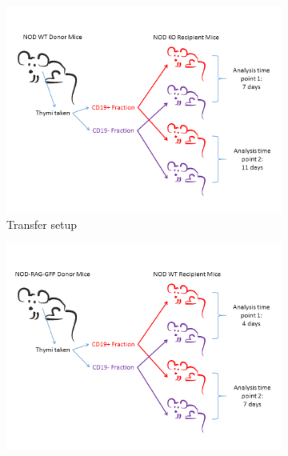 
\begin{figure}
	\begin{subfigure}{0.5\textwidth}
	\centering
	\includegraphics[width=\textwidth]{Figures/KOTransferexptsetup.png}
	\caption{Transfer setup}
	\label{fig:KOtransfersetup}
	\end{subfigure}
	\begin{subfigure}{0.5\textwidth}
	\centering
	\includegraphics[width=\textwidth]{Figures/GFPtransfersetup.png}

\end{subfigure}
\end{figure}
